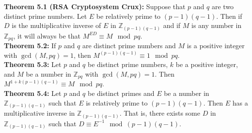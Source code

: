 \documentclass{article}
\begin{document}
\begin{flushleft}
    \textbf{Theorem 5.1 (RSA Cryptosystem Crux):} Suppose that $p$ and $q$ are two distinct prime numbers. Let $E$ be relatively prime to $(p-1)(q-1)$. Then if $D$ is the multiplicative inverse of $E$ in $\mathbb{Z}_{(p-1)(q-1)}$ and if $M$ is any number in $\mathbb{Z}_{pq}$, it will always be that $M^{ED} \equiv M \mod{pq}$.\\

    \textbf{Theorem 5.2:} If $p$ and $q$ are distinct prime numbers and $M$ is a positive integer with $\gcd(M, pq) = 1$, then $M^{(p-1)(q-1)} \equiv 1 \mod{pq}$.\\

    \textbf{Theorem 5.3:} Let $p$ and $q$ be distinct prime numbers, $k$ be a positive integer, and $M$ be a number in $\mathbb{Z}_{pq}$ with $\gcd(M, pq) = 1$. Then $M^{1+k(p-1)(q-1)} \equiv M \mod{pq}$.\\

    \textbf{Theorem 5.4:} Let $p$ and $q$ be distinct primes and $E$ be a number in $\mathbb{Z}_{(p-1)(q-1)}$ such that $E$ is relatively prime to $(p-1)(q-1)$. Then $E$ has a multiplicative inverse in $\mathbb{Z}_{(p-1)(q-1)}$. That is, there exists some $D$ in $\mathbb{Z}_{(p-1)(q-1)}$ such that $D \equiv E^{-1} \mod{(p-1)(q-1)}$.
\end{flushleft}
\end{document}
